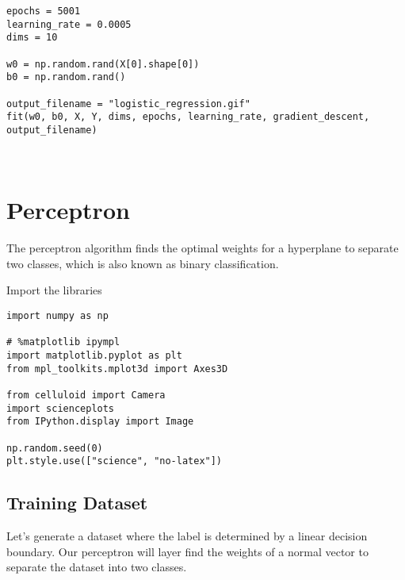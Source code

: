 \documentclass[openany]{book}
\begin{document}
\begin{tcolorbox}
\tiny
\begin{verbatim}
epochs = 5001
learning_rate = 0.0005
dims = 10

w0 = np.random.rand(X[0].shape[0])
b0 = np.random.rand()

output_filename = "logistic_regression.gif"
fit(w0, b0, X, Y, dims, epochs, learning_rate, gradient_descent, output_filename)
\end{verbatim}
\end{tcolorbox}

    \begin{center}
    \end{center}
    { \hspace*{\fill} \\}
        
    \section{Perceptron}\label{perceptron}

The perceptron algorithm finds the optimal weights for a hyperplane to
separate two classes, which is also known as binary classification.

    Import the libraries

\begin{tcolorbox}
\tiny
\begin{verbatim}
import numpy as np

# %matplotlib ipympl
import matplotlib.pyplot as plt
from mpl_toolkits.mplot3d import Axes3D

from celluloid import Camera
import scienceplots
from IPython.display import Image

np.random.seed(0)
plt.style.use(["science", "no-latex"])
\end{verbatim}
\end{tcolorbox}

    \subsection{Training Dataset}\label{training-dataset}

Let's generate a dataset where the label is determined by a linear
decision boundary. Our perceptron will layer find the weights of a
normal vector to separate the dataset into two classes.
\end{document}
